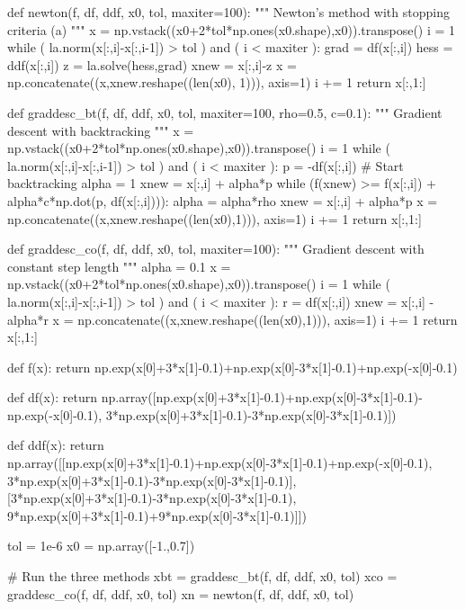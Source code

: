 \documentclass{article}
\begin{document}
\begin{ipythonnb}
def newton(f, df, ddf, x0, tol, maxiter=100):
    """
    Newton's method with stopping criteria (a)
    """
    x = np.vstack((x0+2*tol*np.ones(x0.shape),x0)).transpose()
    i = 1
    while ( la.norm(x[:,i]-x[:,i-1]) > tol ) and ( i < maxiter ):
        grad = df(x[:,i])
        hess = ddf(x[:,i])
        z = la.solve(hess,grad)
        xnew = x[:,i]-z
        x = np.concatenate((x,xnew.reshape((len(x0), 1))), axis=1)
        i += 1
    return x[:,1:]

def graddesc_bt(f, df, ddf, x0, tol, maxiter=100, rho=0.5, c=0.1):
    """
    Gradient descent with backtracking
    """
    x = np.vstack((x0+2*tol*np.ones(x0.shape),x0)).transpose()
    i = 1
    while ( la.norm(x[:,i]-x[:,i-1]) > tol ) and ( i < maxiter ):
        p = -df(x[:,i])
        # Start backtracking
        alpha = 1
        xnew = x[:,i] + alpha*p
        while (f(xnew) >= f(x[:,i]) + alpha*c*np.dot(p, df(x[:,i]))):
            alpha = alpha*rho
            xnew = x[:,i] + alpha*p
        x = np.concatenate((x,xnew.reshape((len(x0),1))), axis=1)
        i += 1
    return x[:,1:]

def graddesc_co(f, df, ddf, x0, tol, maxiter=100):
    """
    Gradient descent with constant step length
    """
    alpha = 0.1
    x = np.vstack((x0+2*tol*np.ones(x0.shape),x0)).transpose()
    i = 1
    while ( la.norm(x[:,i]-x[:,i-1]) > tol ) and ( i < maxiter ):
        r = df(x[:,i])
        xnew = x[:,i] - alpha*r
        x = np.concatenate((x,xnew.reshape((len(x0),1))), axis=1)
        i += 1
    return x[:,1:]
\end{ipythonnb}

\begin{ipythonnb}
def f(x):
    return np.exp(x[0]+3*x[1]-0.1)+np.exp(x[0]-3*x[1]-0.1)+np.exp(-x[0]-0.1)

def df(x):
    return np.array([np.exp(x[0]+3*x[1]-0.1)+np.exp(x[0]-3*x[1]-0.1)-np.exp(-x[0]-0.1), 
                     3*np.exp(x[0]+3*x[1]-0.1)-3*np.exp(x[0]-3*x[1]-0.1)])

def ddf(x):
    return np.array([[np.exp(x[0]+3*x[1]-0.1)+np.exp(x[0]-3*x[1]-0.1)+np.exp(-x[0]-0.1), 
                     3*np.exp(x[0]+3*x[1]-0.1)-3*np.exp(x[0]-3*x[1]-0.1)], 
                     [3*np.exp(x[0]+3*x[1]-0.1)-3*np.exp(x[0]-3*x[1]-0.1),
                    9*np.exp(x[0]+3*x[1]-0.1)+9*np.exp(x[0]-3*x[1]-0.1)]])
\end{ipythonnb}

\begin{ipythonnb}
tol = 1e-6
x0 = np.array([-1.,0.7])

# Run the three methods
xbt = graddesc_bt(f, df, ddf, x0, tol)
xco = graddesc_co(f, df, ddf, x0, tol)
xn = newton(f, df, ddf, x0, tol)
\end{ipythonnb}
\end{document}
